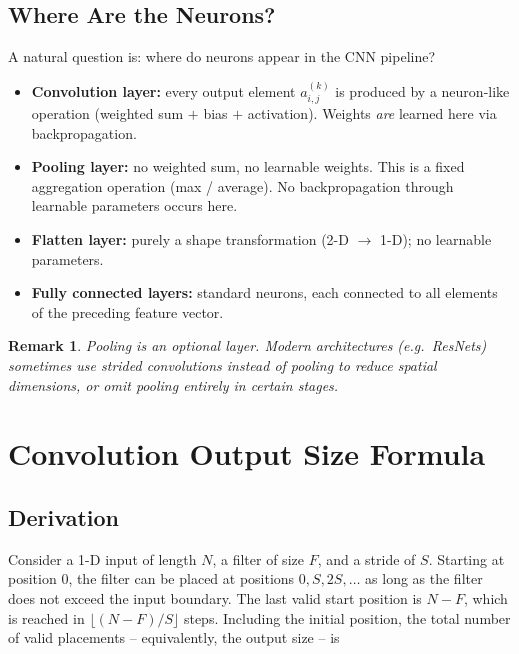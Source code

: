 \documentclass[12pt,a4paper]{article}
\newtheorem{remark}{Remark}[section]
\begin{document}
\subsection{Where Are the Neurons?}
\label{subsec:where_neurons}

A natural question is: where do neurons appear in the CNN pipeline?

\begin{itemize}[leftmargin=2em]
  \item \textbf{Convolution layer:} every output element $a_{i,j}^{(k)}$ is
        produced by a neuron-like operation (weighted sum $+$ bias $+$
        activation).  Weights \emph{are} learned here via backpropagation.
  \item \textbf{Pooling layer:} no weighted sum, no learnable weights.  This
        is a fixed aggregation operation (max / average).  No
        backpropagation through learnable parameters occurs here.
  \item \textbf{Flatten layer:} purely a shape transformation (2-D
        $\to$ 1-D); no learnable parameters.
  \item \textbf{Fully connected layers:} standard neurons, each connected to
        all elements of the preceding feature vector.
\end{itemize}

\begin{remark}
Pooling is an \emph{optional} layer.  Modern architectures (e.g.\
ResNets) sometimes use strided convolutions instead of pooling to reduce
spatial dimensions, or omit pooling entirely in certain stages.
\end{remark}

\section{Convolution Output Size Formula}
\label{sec:output_size}

\subsection{Derivation}
\label{subsec:derivation}

Consider a 1-D input of length $N$, a filter of size $F$, and a stride of
$S$.  Starting at position $0$, the filter can be placed at positions
$0, S, 2S, \ldots$ as long as the filter does not exceed the input boundary.
The last valid start position is $N - F$, which is reached in
$\lfloor(N-F)/S\rfloor$ steps.  Including the initial position, the total
number of valid placements -- equivalently, the output size -- is
\end{document}
